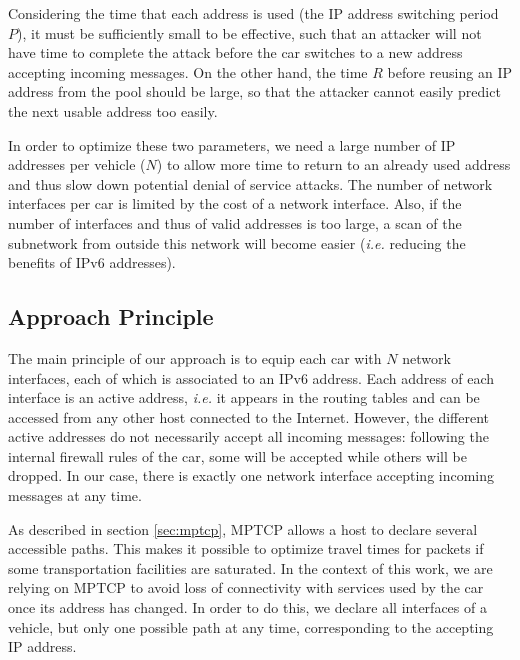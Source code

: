Considering the time that each address is used (the IP address
switching period $P$), it must be sufficiently small to be effective,
such that an attacker will not have time to complete the attack before
the car switches to a new address accepting incoming messages. On the
other hand, the time $R$ before reusing an IP address from the pool
should be large, so that the attacker cannot easily predict the next
usable address too easily.

In order to optimize these two parameters, we need a large number of
IP addresses per vehicle ($N$) to allow more time to return to an
already used address and thus slow down potential denial of service
attacks. The number of network interfaces per car is limited by the
cost of a network interface. Also, if the number of interfaces and
thus of valid addresses is too large, a scan of the subnetwork from
outside this network will become easier (\emph{i.e.} reducing the benefits
of IPv6 addresses).


\subsection{Approach Principle}

The main principle of our approach is to equip each car with $N$
network interfaces, each of which is associated to an IPv6
address. Each address of each interface is an active address,
\emph{i.e.} it appears in the routing tables and can be accessed from
any other host connected to the Internet. However, the different
active addresses do not necessarily accept all incoming messages:
following the internal firewall rules of the car, some will be
accepted while others will be dropped. In our case, there is exactly
one network interface accepting incoming messages at any time.

As described in section \ref{sec:mptcp}, MPTCP allows a host to
declare several accessible paths. This makes it possible to optimize
travel times for packets if some transportation facilities are
saturated. In the context of this work, we are relying on MPTCP to
avoid loss of connectivity with services used by the car once its
address has changed. In order to do this, we declare all interfaces of
a vehicle, but only one possible path at any time, corresponding to
the accepting IP address.

